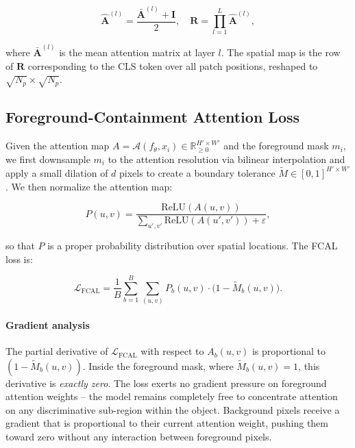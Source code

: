 \documentclass[journal]{IEEEtran}
\begin{document}
\begin{equation}
  \hat{\mathbf{A}}^{(l)}
    = \frac{\bar{\mathbf{A}}^{(l)} + \mathbf{I}}{2},
  \quad
  \mathbf{R} = \prod_{l=1}^{L} \hat{\mathbf{A}}^{(l)},
  \label{eq:rollout}
\end{equation}

where $\bar{\mathbf{A}}^{(l)}$ is the mean attention matrix at
layer $l$. The spatial map is the row of $\mathbf{R}$
corresponding to the CLS token over all patch positions,
reshaped to $\sqrt{N_p} \times \sqrt{N_p}$.

\subsection{Foreground-Containment Attention Loss}
\label{subsec:fcal}

Given the attention map $A = \mathcal{A}(f_\theta, x_i) \in
\mathbb{R}_{\geq 0}^{H' \times W'}$ and the foreground mask $m_i$,
we first downsample $m_i$ to the attention resolution via bilinear
interpolation and apply a small dilation of $d$ pixels to create
a boundary tolerance $\tilde{M} \in [0,1]^{H' \times W'}$.
We then normalize the attention map:

\begin{equation}
  P(u,v) = \frac{\mathrm{ReLU}(A(u,v))}
                 {\displaystyle\sum_{u',v'}
                  \mathrm{ReLU}(A(u',v')) + \varepsilon},
  \label{eq:prob}
\end{equation}

so that $P$ is a proper probability distribution over spatial
locations. The FCAL loss is:

\begin{equation}
  \mathcal{L}_{\mathrm{FCAL}}
    = \frac{1}{B}\sum_{b=1}^{B}
      \sum_{(u,v)} P_b(u,v)
      \cdot \bigl(1 - \tilde{M}_b(u,v)\bigr).
  \label{eq:fcal}
\end{equation}

\paragraph{Gradient analysis}
The partial derivative of $\mathcal{L}_{\mathrm{FCAL}}$ with
respect to $A_b(u,v)$ is proportional to
$(1 - \tilde{M}_b(u,v))$. Inside the foreground mask, where
$\tilde{M}_b(u,v) = 1$, this derivative is \emph{exactly zero}.
The loss exerts no gradient pressure on foreground attention
weights -- the model remains completely free to concentrate
attention on any discriminative sub-region within the object.
Background pixels receive a gradient that is proportional to
their current attention weight, pushing them toward zero without
any interaction between foreground pixels.
\end{document}
